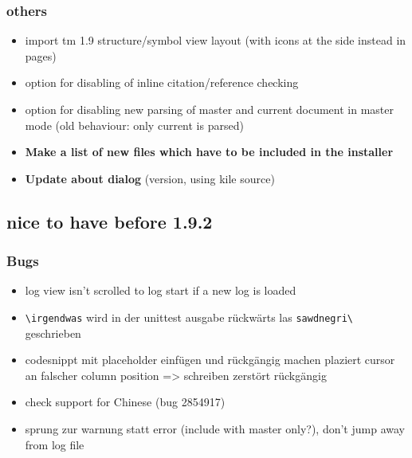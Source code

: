 \documentclass[10pt,a4paper,landscape]{report}
\begin{document}
\subsubsection{others}
\begin{itemize}
	\item import tm 1.9 structure/symbol view layout (with icons at the side instead in pages)
	\item option for disabling of inline citation/reference checking
	\item option for disabling new parsing of master and current document in master mode (old behaviour: only current is parsed)
	\item \textbf{Make a list of new files which have to be included in the installer} 
	\item \textbf{Update about dialog}  (version, using kile source)
\end{itemize}

\subsection{nice to have before 1.9.2 }
\subsubsection{Bugs}
\begin{itemize}
	\item log view isn't scrolled to log start if a new log is loaded
\item \verb+\irgendwas+ wird in der unittest ausgabe rückwärts las \verb+sawdnegri\+ geschrieben
	\item codesnippt mit placeholder einfügen und rückgängig machen plaziert cursor an falscher column position => schreiben zerstört rückgängig
	\item check support for Chinese (bug 2854917)
	\item sprung zur warnung statt error (include with master only?), don't jump away from log file
\end{itemize}
\end{document}
